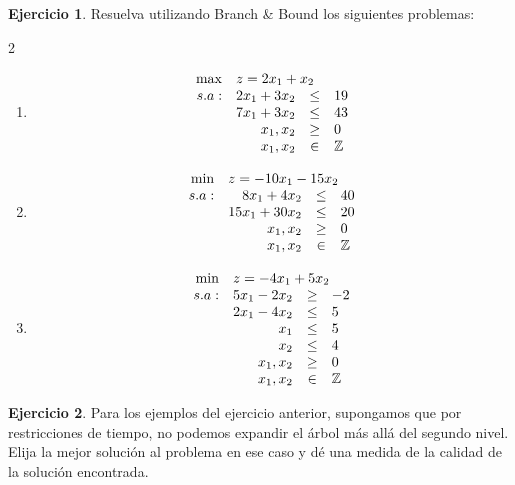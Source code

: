 \documentclass[12pt]{article}
\theoremstyle{definition}
\newtheorem{ejer}{Ejercicio}
\newcommand{\bej}{\begin{ejer}}
\newcommand{\fej}{\end{ejer}}
\begin{document}
\bej
    Resuelva utilizando Branch \& Bound los siguientes problemas:
    \begin{multicols}{2}
    \begin{enumerate}[label=\alph*)]
    \item \[
        \begin{array}{rrcl}
        \max & \multicolumn{3}{l}{z = 2x_1+x_2} \\
        s.a: & 2x_1+3x_2 & \leq & 19 \\
         & 7x_1+3x_2 & \leq & 43 \\
         & x_1, x_2 & \geq & 0 \\
         & x_1, x_2 &\in & \mathbb{Z}
        \end{array}
        \]

    \item \[
        \begin{array}{rrcl}
        \min & \multicolumn{3}{l}{z = -10x_1-15x_2} \\
        s.a: & 8x_1+4x_2 & \leq & 40 \\
         & 15x_1+30x_2 & \leq & 20 \\
          & x_1, x_2 & \geq & 0 \\
         & x_1, x_2 &\in & \mathbb{Z}
        \end{array}
        \]
    \item \[
        \begin{array}{rrcl}
        \min & \multicolumn{3}{l}{z = -4x_1+5x_2} \\
        s.a: & 5x_1-2x_2 & \geq & -2 \\
         & 2x_1-4x_2 & \leq & 5 \\
         & x_1 & \leq & 5 \\
         & x_2 & \leq & 4 \\
           & x_1, x_2 & \geq & 0 \\
         & x_1, x_2 &\in & \mathbb{Z}

        \end{array}
        \]
    \end{enumerate}
    \end{multicols} 
\fej

\bej
    Para los ejemplos del ejercicio anterior, supongamos que por restricciones de tiempo, no
    podemos expandir el árbol más allá del segundo nivel. Elija la mejor solución al problema en
    ese caso y dé una medida de la calidad de la solución encontrada.
\fej
\end{document}

